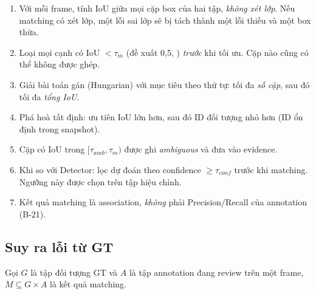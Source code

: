 \begin{enumerate}
  \item Với mỗi frame, tính IoU giữa mọi cặp box của hai tập, \emph{không xét lớp}.
        Nếu matching có xét lớp, một lỗi sai lớp sẽ bị tách thành một lỗi thiếu
        và một box thừa.
  \item Loại mọi cạnh có IoU $< \tau_m$ (đề xuất 0{,}5, \TBD[-05]) \emph{trước}
        khi tối ưu. Cặp nào cũng có thể không được ghép.
  \item Giải bài toán gán (Hungarian) với mục tiêu theo thứ tự: tối đa \emph{số
        cặp}, sau đó tối đa \emph{tổng IoU}.
  \item Phá hoà tất định: ưu tiên IoU lớn hơn, sau đó ID đối tượng nhỏ hơn
        (ID ổn định trong snapshot).
  \item Cặp có IoU trong \([\tau_{amb}, \tau_m)\) được ghi \emph{ambiguous} và
        đưa vào evidence.
  \item Khi so với Detector: lọc dự đoán theo confidence $\ge \tau_{conf}$ trước
        khi matching. Ngưỡng này được chọn trên tập hiệu chỉnh.
  \item Kết quả matching là association, \emph{không} phải Precision/Recall của
        annotation (B-21).
\end{enumerate}

\subsection{Suy ra lỗi từ GT}
Gọi \(G\) là tập đối tượng GT và \(A\) là tập annotation đang review trên một
frame, \(M \subseteq G \times A\) là kết quả matching.

